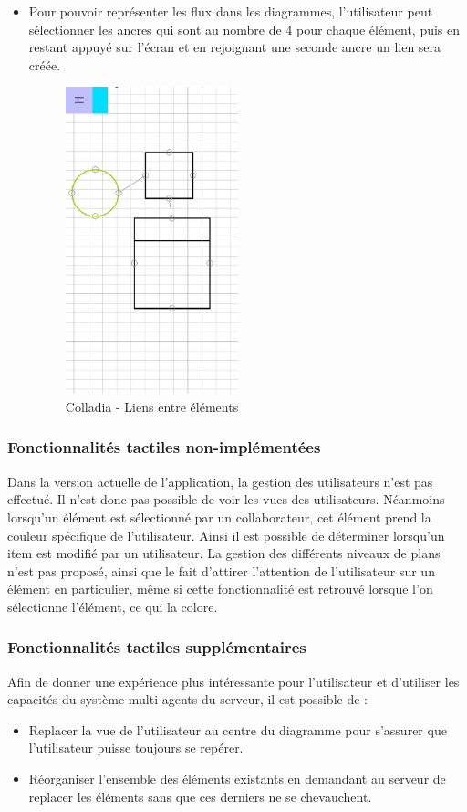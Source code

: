 \begin{itemize}
\item Pour pouvoir représenter les flux dans les diagrammes, l'utilisateur peut sélectionner les ancres qui sont au nombre de 4 pour chaque élément, puis en restant appuyé sur l'écran et en rejoignant une seconde ancre un lien sera créée.
		\begin{figure}[!h]
			\centering
			\includegraphics[width=5cm]{img/screen/colladia_draw_view_element_links}
			\caption{Colladia - Liens entre éléments}
		\end{figure}
\end{itemize}
	
\subsubsection{Fonctionnalités tactiles non-implémentées}

Dans la version actuelle de l'application, la gestion des utilisateurs n'est pas effectué. Il n'est donc pas possible de voir les vues des utilisateurs. Néanmoins lorsqu'un élément est sélectionné par un collaborateur, cet élément prend la couleur spécifique de l'utilisateur. Ainsi il est possible de déterminer lorsqu'un item est modifié par un utilisateur. 
La gestion des différents niveaux de plans n'est pas proposé, ainsi que le fait d'attirer l'attention de l'utilisateur sur un élément en particulier, même si cette fonctionnalité est retrouvé lorsque l'on sélectionne l'élément, ce qui la colore. 

\subsubsection{Fonctionnalités tactiles supplémentaires}
Afin de donner une expérience plus intéressante pour l'utilisateur et d'utiliser les capacités du système multi-agents du serveur, il est possible de :
\begin{itemize}
	\item Replacer la vue de l'utilisateur au centre du diagramme pour s'assurer que l'utilisateur puisse toujours se repérer.
	\item Réorganiser l'ensemble des éléments existants en demandant au serveur de replacer les éléments sans que ces derniers ne se chevauchent.
\end{itemize}

